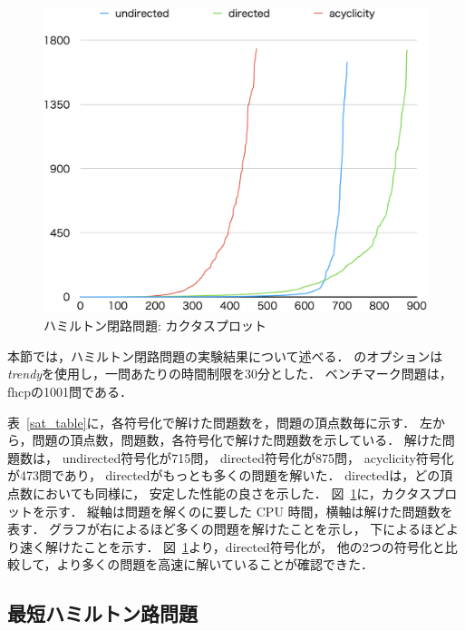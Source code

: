 \begin{figure}[tb]
\begin{center}
  \includegraphics[width=0.8\linewidth]{fig/cactus_fhcp.png}
\caption{ハミルトン閉路問題: カクタスプロット}
\label{cactus}
\end{center}
\end{figure}


本節では，ハミルトン閉路問題の実験結果について述べる．
{\clingo}のオプションは\textit{trendy}を使用し，一問あたりの時間制限を30分とした．
ベンチマーク問題は，\textsf{fhcp}の1001問である．

表~\ref{sat_table}に，各符号化で解けた問題数を，問題の頂点数毎に示す．
左から，問題の頂点数，問題数，各符号化で解けた問題数を示している．
%
解けた問題数は，
\textsf{undirected}符号化が715問，
\textsf{directed}符号化が875問，
\textsf{acyclicity}符号化が473問であり，
\textsf{directed}がもっとも多くの問題を解いた．
\textsf{directed}は，どの頂点数においても同様に，
安定した性能の良さを示した．
図~\ref{cactus}に，カクタスプロットを示す．
縦軸は問題を解くのに要した CPU 時間，横軸は解けた問題数を表す．
グラフが右によるほど多くの問題を解けたことを示し，
下によるほどより速く解けたことを示す．
図~\ref{cactus}より，\textsf{directed}符号化が，
他の2つの符号化と比較して，より多くの問題を高速に解いていることが確認できた．

\subsection{最短ハミルトン路問題}

